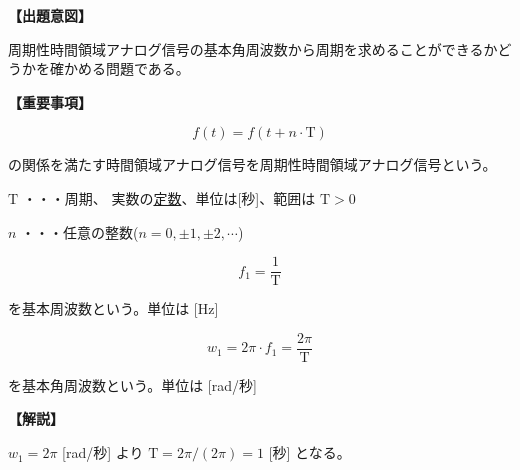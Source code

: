 \noindent \textbf{【出題意図】}

\noindent 周期性時間領域アナログ信号の基本角周波数から周期を求めることができるかどうかを確かめる問題である。

\vspace{1em}
\noindent \textbf{【重要事項】}

\[
f(t) = f(t + n \cdot \textrm{T})
\]

\noindent の関係を満たす時間領域アナログ信号を周期性時間領域アナログ信号という。

\medskip
\noindent $\textrm{T}$ ・・・周期、 実数の\underline{定数}、単位は[秒]、範囲は $\textrm{T} > 0$

\medskip
\noindent $n$ ・・・任意の整数($n = 0,\pm1,\pm2,\cdots$)

\[
f_1 = \frac{1}{\textrm{T}}
\]

\noindent を基本周波数という。単位は [Hz]

\[
w_1 = 2\pi \cdot f_1 = \frac{2\pi}{\textrm{T}}
\]

\noindent を基本角周波数という。単位は [rad/秒] 


\vspace{1em}
\noindent \textbf{【解説】}

\noindent $w_1 = 2\pi$ [rad/秒] より $\textrm{T}=2\pi/(2\pi) = 1$ [秒] となる。
